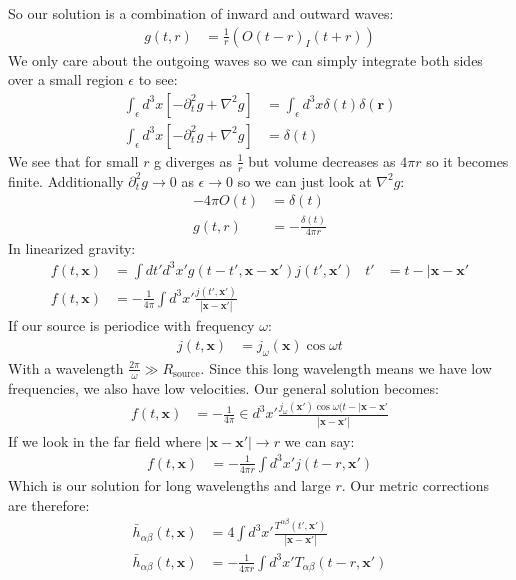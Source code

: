 So our solution is a combination of inward and outward waves:
\begin{align*}
	g(t,r) &= \frac{1}{r}(O(t-r) _ I(t+r))
\end{align*}
We only care about the outgoing waves so we can simply integrate both sides over a small region $\epsilon$ to see:
\begin{align*}
	\int_\epsilon d^3 x \left[ -\partial_t^2 g + \nabla^2 g\right] &= \int_\epsilon d^3 x \delta(t) \delta(\bm{r}) \\
	\int_\epsilon d^3 x \left[ -\partial_t^2 g + \nabla^2 g\right] &= \delta(t)
\end{align*}
We see that for small $r$ g diverges as $\frac{1}{r}$ but volume decreases as $4\pi r$ so it becomes finite.
Additionally $\partial_t^2 g \to 0$ as $\epsilon\to0$ so we can just look at $\nabla^2 g$:
\begin{align*}
	-4\pi O(t) &= \delta(t) \\
	g(t,r) &= -\frac{\delta(t)}{4\pi r}
\end{align*}
In linearized gravity:
\begin{align*}
	f(t,\bm{x}) &= \int dt' d^3 x' g(t-t', \bm{x} - \bm{x}')j(t',\bm{x}') & t' &= t - |\bm{x} - \bm{x}' \\
	f(t,\bm{x}) &= -\frac{1}{4\pi} \int d^3 x' \frac{j(t',\bm{x}')}{|\bm{x} - \bm{x}'|}
\end{align*}
If our source is periodice with frequency $\omega$:
\begin{align*}
	j(t,\bm{x}) &= j_\omega(\bm{x}) \cos\omega t
\end{align*}
With a wavelength $\frac{2\pi}{\omega} \gg R_\text{source}$. Since this long wavelength means we have low frequencies, we also have low velocities. Our general solution becomes:
\begin{align*}
	f(t,\bm{x}) &= -\frac{1}{4\pi} \in d^3 x' \frac{j_\omega(\bm{x}') \cos \omega(t- |\bm{x} - \bm{x}'}{|\bm{x} - \bm{x}'|}
\end{align*}
If we look in the far field where $|\bm{x} - \bm{x}'| \to r$ we can say:
\begin{align*}
	f(t,\bm{x}) &= -\frac{1}{4\pi r} \int d^3x' j(t-r,\bm{x}')
\end{align*}
Which is our solution for long wavelengths and large $r$. Our metric corrections are therefore:
\begin{align*}
	\bar{h}_{\alpha\beta}(t,\bm{x}) &= 4\int d^3 x' \frac{T^{\alpha\beta}(t',\bm{x}')}{|\bm{x} - \bm{x}'|} \\
	\bar{h}_{\alpha\beta}(t,\bm{x}) &= -\frac{1}{4\pi r} \int d^3x' T_{\alpha\beta}(t-r,\bm{x}')
\end{align*}
